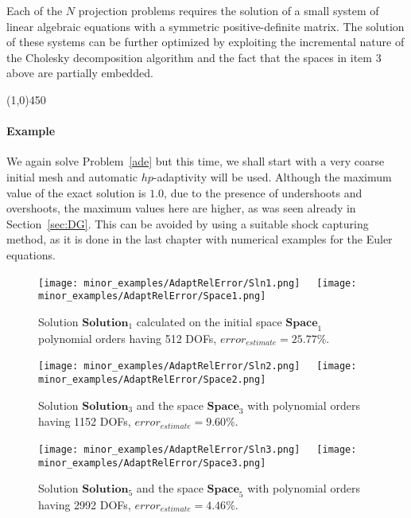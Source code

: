 Each of the $N$ projection problems requires the solution of a small
system of linear algebraic equations with a symmetric positive-definite
matrix. The solution of these systems can be further optimized by exploiting
the incremental nature of the Cholesky decomposition algorithm 
and the fact that the spaces in item 3 above are partially embedded. 

\begin{center}
\line(1,0){450}
\end{center}

\paragraph{Example}
We again solve Problem~\ref{ade} but this time, we shall start with a very coarse initial mesh and automatic $hp$-adaptivity will be used. Although the maximum value of the exact solution is $1.0$, due to the presence of undershoots and overshoots, the maximum values here are higher, as was seen already in Section~\ref{sec:DG}. This can be avoided by using a suitable shock capturing method, as it is done in the last chapter with numerical examples for the Euler equations.
\begin{figure}[H]
\begin{center}
\texttt{[image: minor\_examples/AdaptRelError/Sln1.png]}\ \ \ 
\texttt{[image: minor\_examples/AdaptRelError/Space1.png]}
\end{center}

\caption{Solution $\mathbf{Solution}_1$ calculated on the initial space $\mathbf{Space}_1$ polynomial orders having 512 DOFs, $error_{estimate} = 25.77\%$.}
\end{figure}

\begin{figure}[H]
\begin{center}
\texttt{[image: minor\_examples/AdaptRelError/Sln2.png]}\ \ \ 
\texttt{[image: minor\_examples/AdaptRelError/Space2.png]}
\end{center}

\caption{Solution $\mathbf{Solution}_3$ and the space $\mathbf{Space}_3$ with polynomial orders having 1152 DOFs, $error_{estimate} = 9.60\%$.}
\end{figure}

\begin{figure}[H]
\begin{center}
\texttt{[image: minor\_examples/AdaptRelError/Sln3.png]}\ \ \ 
\texttt{[image: minor\_examples/AdaptRelError/Space3.png]}
\end{center}

\caption{Solution $\mathbf{Solution}_5$ and the space $\mathbf{Space}_5$ with polynomial orders having 2992 DOFs, $error_{estimate} = 4.46\%$.}
\end{figure}

